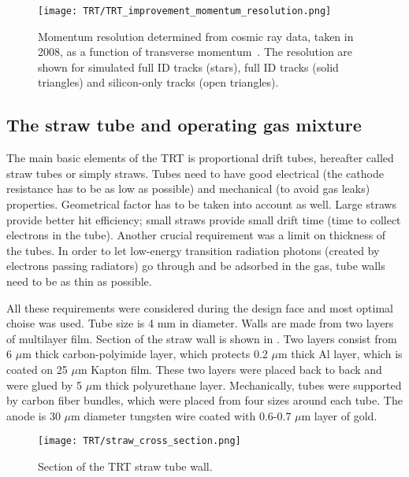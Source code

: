 \begin{figure}
\centering
\texttt{[image: TRT/TRT\_improvement\_momentum\_resolution.png]}
\caption{ 
Momentum resolution determined from cosmic ray data, taken in 2008, as a function of transverse momentum~\cite{Aad:2010bx}.
The resolution are shown for simulated full ID tracks (stars), full ID tracks (solid triangles) and silicon-only tracks (open triangles).
}
\label{fig:gas_gain}
\end{figure}



\subsection{The straw tube and operating gas mixture}

The main basic elements of the TRT is proportional drift tubes, hereafter called straw tubes or simply straws.
Tubes need to have good electrical (the cathode resistance has to be as low as possible) and mechanical (to avoid gas leaks) properties.
Geometrical factor has to be taken into account as well. Large straws provide better hit efficiency; small straws provide small drift time (time to collect electrons in the tube).
Another crucial requirement was a limit on thickness of the tubes. 
In order to let low-energy transition radiation photons (created by electrons passing radiators) go through and be adsorbed in the gas, tube walls need to be as thin as possible.

All these requirements were considered during the design face and most optimal choise was used.
Tube size is 4 mm in diameter. Walls are made from two layers of multilayer film. Section of the straw wall is shown in .
Two layers consist from 6 $\mu$m thick carbon-polyimide layer, which protects 0.2 $\mu$m thick Al layer, which is coated on 25 $\mu$m Kapton film.
These two layers were placed back to back and were glued by 5 $\mu$m thick polyurethane layer.
Mechanically, tubes were supported by carbon fiber bundles, which were placed from four sizes around each tube.
The anode is 30 $\mu$m diameter tungsten wire coated with 0.6-0.7 $\mu$m layer of gold.

\begin{figure}
\centering
\texttt{[image: TRT/straw\_cross\_section.png]}
\caption{ 
Section of the TRT straw tube wall.
}
\label{fig:straw_wall_section}
\end{figure}

